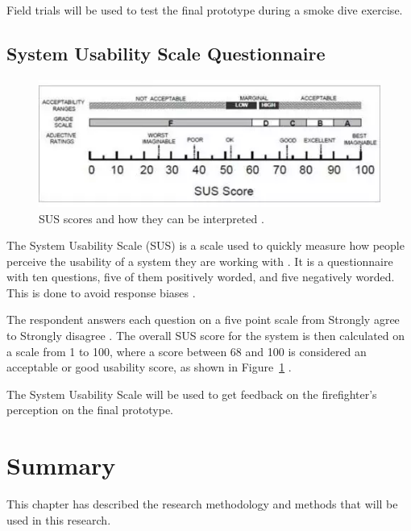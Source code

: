 \documentclass[../Main/thesis.tex]{subfiles}
\begin{document}
Field trials will be used to test the final prototype during a smoke dive exercise.

\subsection{System Usability Scale Questionnaire}
\begin{figure}[h]
	\centering
	\includegraphics[width=\textwidth]{../fig/sus-score}
	\caption[SUS scores and how they can be interpreted]{SUS scores and how they can be interpreted \citep{Brooke2013}.}
	\label{fig:sus-score}
\end{figure}

The System Usability Scale (SUS) is a scale used to quickly measure how people perceive the usability of a system they are working with \citep{Brooke2013}.
It is a questionnaire with ten questions, five of them positively worded, and five negatively worded.
This is done to avoid response biases \citep{Brooke2013}.

The respondent answers each question on a five point scale from Strongly agree to Strongly disagree \citep{AssistantSecretaryforPublicAffairs2013}.
The overall SUS score for the system is then calculated on a scale from 1 to 100, where a score between 68 and 100 is considered an acceptable or good usability score, as shown in Figure~\ref{fig:sus-score} \citep{AssistantSecretaryforPublicAffairs2013}.

The System Usability Scale will be used to get feedback on the firefighter's perception on the final prototype.


\section{Summary}
This chapter has described the research methodology and methods that will be used in this research. 

\blankpage


\onlyinsubfile{}
\onlyinsubfile{}
\end{document}
